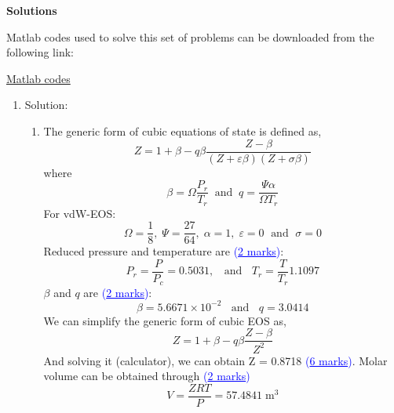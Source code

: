 \documentclass[12pts,a4paper,amsmath,amssymb,floatfix]{article}%
\renewcommand\epsilon{\varepsilon}
\newcommand{\frc}{\displaystyle\frac}
\newcommand{\blue}{\textcolor{blue}}
\begin{document}
\clearpage

\begin{center}
  \Large{\bf Solutions}
\end{center}

Matlab codes used to solve this set of problems can be downloaded from the following link:
\begin{center}
    \href{https://www.dropbox.com/s/6uatv9ay9kelkq0/2016.zip?dl=0}{Matlab codes}
\end{center}

\begin{enumerate}[label=\bfseries Problem \arabic*:]
   \item Solution:
      \begin{enumerate}[label=\bfseries Task \arabic*:]
          \item The generic form of cubic equations of state is defined as,
              \begin{displaymath}
                 Z = 1 + \beta - q\beta \frc{Z - \beta}{\left(Z+\epsilon\beta\right)\left(Z+\sigma\beta\right)}
              \end{displaymath}
              where 
              \begin{displaymath}
                 \beta = \Omega\frc{P_{r}}{T_{r}}\;\;\text{and}\;\; q = \frc{\Psi\alpha}{\Omega T_{r}}
              \end{displaymath}
              For vdW-EOS:
              \begin{displaymath}
                  \Omega = \frc{1}{8},\; \Psi=\frc{27}{64},\; \alpha=1,\; \epsilon = 0\;\text{ and }\; \sigma=0
              \end{displaymath}
              Reduced pressure and temperature are \blue{(\underline{2 marks})}:
              \begin{displaymath}
                  P_{r} = \frc{P}{P_{c}} = 0.5031,\;\;\text{ and }\;\; T_{r} = \frc{T}{T_{r}} 1.1097
              \end{displaymath}
              $\beta$ and $q$ are \blue{(\underline{2 marks})}:
              \begin{displaymath}
                 \beta = 5.6671\times 10^{-2}\;\;\text{ and }\;\; q = 3.0414
              \end{displaymath}
              We can simplify the generic form of cubic EOS as,
              \begin{displaymath}
                  Z =  1 + \beta - q\beta\frc{Z-\beta}{Z^{2}}
              \end{displaymath}
              And solving it (calculator), we can obtain Z = 0.8718 \blue{(\underline{6 marks})}. Molar volume can be obtained through \blue{(\underline{2 marks})}
              \begin{displaymath}
                  V = \frc{Z R T}{P} = 57.4841\;\text{m}^{3}
              \end{displaymath}


\end{enumerate}
\end{enumerate}
\end{document}
